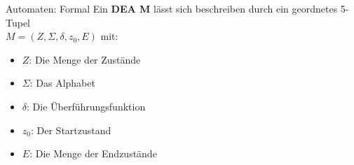 %
%
%
%

\begin{frame}{Automaten: Formal}
  Ein \textbf{DEA M} lässt sich beschreiben durch ein geordnetes 5-Tupel\\
  \alert{$M=(Z, \Sigma, \delta, z_0, E)$} mit:
  \begin{itemize}
    \item $Z$: Die Menge der Zustände
    \item $\Sigma$: Das Alphabet
    \item $\delta$: Die Überführungsfunktion
    \item $z_0$: Der Startzustand
    \item $E$: Die Menge der Endzustände
  \end{itemize}
\end{frame}


